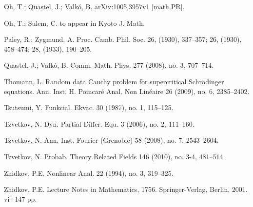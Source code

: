 \documentclass[11pt]{amsart}
\numberwithin{equation}{section} \numberwithin{theorem}{section}
\begin{document}
\begin{thebibliography}{99}
	Oh, T.; Quastel, J.; Valk\'o, B.
	\newblock 	arXiv:1005.3957v1  [math.PR].

	Oh, T.; Sulem, C.
	\newblock to appear in Kyoto J. Math. 

Paley, R.; Zygmund, A.
	\newblock Proc. Camb. Phil. Soc. 26, (1930), 337--357; 26, (1930), 458--474;
	28, (1933), 190--205.

	Quastel, J.; Valk{\'o}, B.
	\newblock   Comm. Math. Phys.  277  (2008),  no. 3, 707--714. 

	Thomann, L.
	\newblock Random data Cauchy problem for supercritical Schr\"odinger equations.
	\newblock  Ann. Inst. H. Poincar\'e Anal. Non Lin\'eaire  26  (2009),  no. 6, 2385--2402. 

	Tsutsumi, Y.
	\newblock Funkcial. Ekvac.  30  (1987),  no. 1, 115--125.

	

Tzvetkov, N.
	\newblock Dyn. Partial Differ. Equ.  3  (2006),  no. 2, 111--160.

	Tzvetkov, N.
	\newblock Ann. Inst. Fourier (Grenoble)  58  (2008),  no. 7, 2543--2604.

	Tzvetkov, N.
	\newblock Probab. Theory Related Fields  146  (2010),  no. 3-4, 481--514. 

	Zhidkov, P.E.
	\newblock Nonlinear Anal.  22  (1994),  no. 3, 319--325. 

	Zhidkov, P.E.
	\newblock  Lecture Notes in Mathematics, 1756. Springer-Verlag, Berlin, 2001. vi+147 pp.

	\end{thebibliography}
\end{document}
